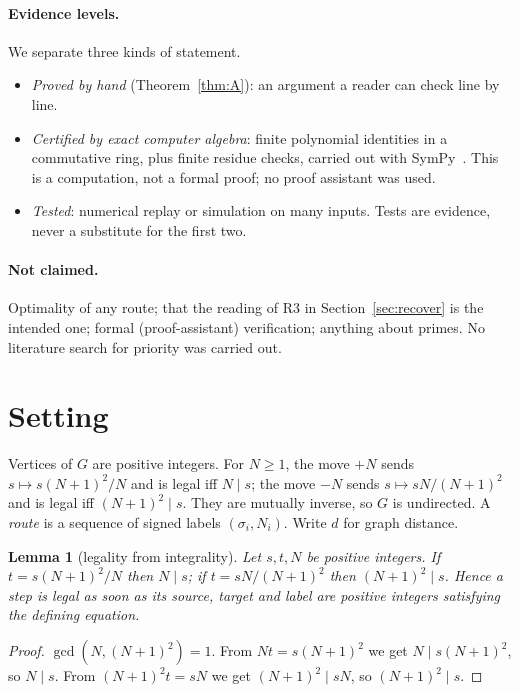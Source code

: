 \documentclass[11pt]{article}
\newtheorem{lemma}[theorem]{Lemma}
\theoremstyle{definition}
\theoremstyle{remark}
\begin{document}
\paragraph{Evidence levels.} We separate three kinds of statement.
\begin{itemize}\setlength\itemsep{1pt}
\item \emph{Proved by hand} (Theorem~\ref{thm:A}): an argument a reader can check line by line.
\item \emph{Certified by exact computer algebra}: finite polynomial identities in a commutative ring, plus finite residue checks, carried out with SymPy~\cite{sympy}. This is a computation, not a formal proof; no proof assistant was used.
\item \emph{Tested}: numerical replay or simulation on many inputs. Tests are evidence, never a substitute for the first two.
\end{itemize}

\paragraph{Not claimed.} Optimality of any route; that the reading of R3 in Section~\ref{sec:recover} is the intended one; formal (proof-assistant) verification; anything about primes. No literature search for priority was carried out.

\section{Setting}
Vertices of $G$ are positive integers. For $N\ge 1$, the move $+N$ sends $s\mapsto s(N+1)^2/N$ and is legal iff $N\mid s$; the move $-N$ sends $s\mapsto sN/(N+1)^2$ and is legal iff $(N+1)^2\mid s$. They are mutually inverse, so $G$ is undirected. A \emph{route} is a sequence of signed labels $(\sigma_i,N_i)$. Write $d$ for graph distance.

\begin{lemma}[legality from integrality]\label{lem:legal}
Let $s,t,N$ be positive integers. If $t=s(N+1)^2/N$ then $N\mid s$; if $t=sN/(N+1)^2$ then $(N+1)^2\mid s$. Hence a step is legal as soon as its source, target and label are positive integers satisfying the defining equation.
\end{lemma}
\begin{proof}
$\gcd(N,(N+1)^2)=1$. From $Nt=s(N+1)^2$ we get $N\mid s(N+1)^2$, so $N\mid s$. From $(N+1)^2t=sN$ we get $(N+1)^2\mid sN$, so $(N+1)^2\mid s$.
\end{proof}
\end{document}

